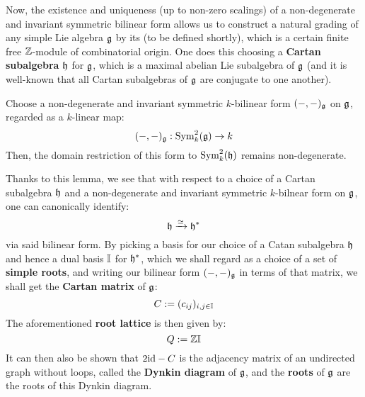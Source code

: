        Now, the existence and uniqueness (up to non-zero scalings) of a non-degenerate and invariant symmetric bilinear form allows us to construct a natural grading of any simple Lie algebra $\mathfrak{g}$ by its  (to be defined shortly), which is a certain finite free $\mathbb{Z}$-module of combinatorial origin. One does this choosing a \textbf{Cartan subalgebra} $\mathfrak{h}$ for $\mathfrak{g}$, which is a maximal abelian Lie subalgebra of $\mathfrak{g}$ (and it is well-known that all Cartan subalgebras of $\mathfrak{g}$ are conjugate to one another).  
        \begin{lemma} \label{lemma: non_degeneracy_of_invariant_bilinear_forms_on_cartan_subalgebras}
            Choose a non-degenerate and invariant symmetric $k$-bilinear form $(-, -)_{\mathfrak{g}}$ on $\mathfrak{g}$, regarded as a $k$-linear map:
                $$(-, -)_{\mathfrak{g}}: \mathrm{Sym}_k^2(\mathfrak{g}) \to k$$
            Then, the domain restriction of this form to $\mathrm{Sym}_k^2(\mathfrak{h})$ remains non-degenerate. 
        \end{lemma}
        Thanks to this lemma, we see that with respect to a choice of a Cartan subalgebra $\mathfrak{h}$ and a non-degenerate and invariant symmetric $k$-bilnear form on $\mathfrak{g}$, one can canonically identify:
            $$\mathfrak{h} \xrightarrow[]{\simeq} \mathfrak{h}^*$$
        via said bilinear form. By picking a basis for our choice of a Catan subalgebra $\mathfrak{h}$ and hence a dual basis $\mathbb{I}$ for $\mathfrak{h}^*$, which we shall regard as a choice of a set of \textbf{simple roots}, and writing our bilinear form $(-, -)_{\mathfrak{g}}$ in terms of that matrix, we shall get the \textbf{Cartan matrix} of $\mathfrak{g}$:
            $$C := (c_{ij})_{i, j \in \mathbb{I}}$$
        The aforementioned \textbf{root lattice} is then given by:
            $$Q := \mathbb{Z} \mathbb{I}$$
        It can then also be shown that $2\mathrm{id} - C$ is the adjacency matrix of an undirected graph without loops, called the \textbf{Dynkin diagram} of $\mathfrak{g}$, and the \textbf{roots} of $\mathfrak{g}$ are the roots of this Dynkin diagram.
            
